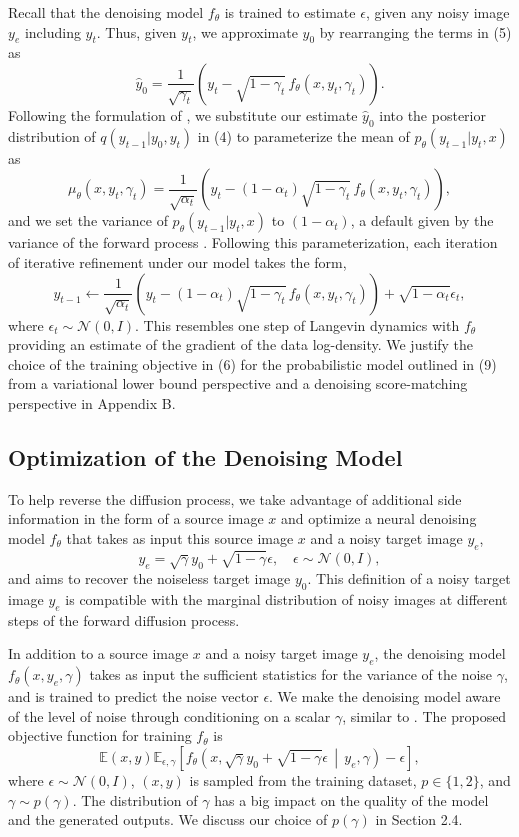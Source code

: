 \documentclass{article}
\begin{document}
Recall that the denoising model $f_{\theta}$ is trained to estimate $\epsilon$, given any noisy image $y_e$ including $y_t$. Thus, given $y_t$, we approximate $y_0$ by rearranging the terms in (5) as
\[
\hat{y}_0 = \frac{1}{\sqrt{\gamma_t}} \left( y_t - \sqrt{1 - \gamma_t} \, f_{\theta}(x, y_t, \gamma_t) \right). 
\]
Following the formulation of \cite{ref17}, we substitute our estimate $\hat{y}_0$ into the posterior distribution of $q(y_{t-1}|y_0, y_t)$ in (4) to parameterize the mean of $p_{\theta}(y_{t-1}|y_t, x)$ as
\[
\mu_{\theta}(x, y_t, \gamma_t) = \frac{1}{\sqrt{\alpha_t}} \left( y_t - (1 - \alpha_t) \sqrt{1 - \gamma_t} \, f_{\theta}(x, y_t, \gamma_t) \right),
\]
and we set the variance of $p_{\theta}(y_{t-1}|y_t, x)$ to $(1 - \alpha_t)$, a default given by the variance of the forward process \cite{ref17}. Following this parameterization, each iteration of iterative refinement under our model takes the form,
\[
y_{t-1} \leftarrow \frac{1}{\sqrt{\alpha_t}} \left( y_t - (1 - \alpha_t) \sqrt{1 - \gamma_t} \, f_{\theta}(x, y_t, \gamma_t) \right) + \sqrt{1 - \alpha_t} \epsilon_t,
\]
where $\epsilon_t \sim \mathcal{N}(0, I)$. This resembles one step of Langevin dynamics with $f_{\theta}$ providing an estimate of the gradient of the data log-density. We justify the choice of the training objective in (6) for the probabilistic model outlined in (9) from a variational lower bound perspective and a denoising score-matching perspective in Appendix B.


\subsection{Optimization of the Denoising Model}

To help reverse the diffusion process, we take advantage of additional side information in the form of a source image $x$ and optimize a neural denoising model $f_{\theta}$ that takes as input this source image $x$ and a noisy target image $y_e$,
\[
y_e = \sqrt{\gamma} y_0 + \sqrt{1 - \gamma} \epsilon, \quad \epsilon \sim \mathcal{N}(0, I),
\]
and aims to recover the noiseless target image $y_0$. This definition of a noisy target image $y_e$ is compatible with the marginal distribution of noisy images at different steps of the forward diffusion process.

In addition to a source image $x$ and a noisy target image $y_e$, the denoising model $f_{\theta}(x, y_e, \gamma)$ takes as input the sufficient statistics for the variance of the noise $\gamma$, and is trained to predict the noise vector $\epsilon$. We make the denoising model aware of the level of noise through conditioning on a scalar $\gamma$, similar to \cite{ref1, ref2}. The proposed objective function for training $f_{\theta}$ is
\[
\mathbb{E}(x,y)\mathbb{E}_{\epsilon,\gamma} \left[ f_{\theta}\left(x, \sqrt{\gamma} y_0 + \sqrt{1 - \gamma} \epsilon \, \middle|\, y_e, \gamma\right) - \epsilon \right],
\]
where $\epsilon \sim \mathcal{N}(0, I)$, $(x, y)$ is sampled from the training dataset, $p \in \{1, 2\}$, and $\gamma \sim p(\gamma)$. The distribution of $\gamma$ has a big impact on the quality of the model and the generated outputs. We discuss our choice of $p(\gamma)$ in Section 2.4.
\end{document}
